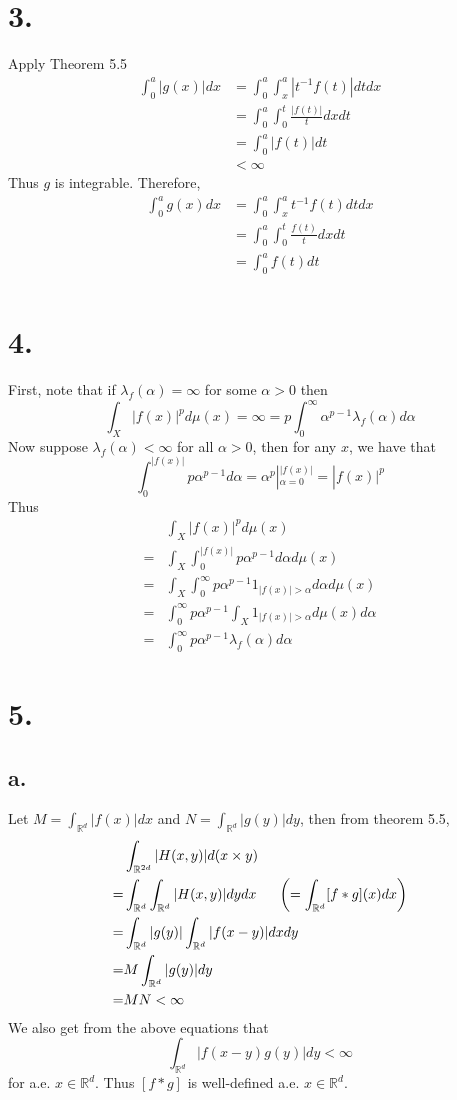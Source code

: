 \documentclass[11pt]{article}
\theoremstyle{mystyle}
\theoremstyle{definition}
\begin{document}
\section*{3.}
Apply Theorem 5.5
\begin{align*}
  \int_0^a |g(x)| dx 
  &= \int_0^a \int_x^a |t^{-1}f(t)| dt dx \\ 
  &= \int_0^a \int_0^t \displaystyle\frac{|f(t)|}{t} dx dt \\
  &= \int_0^a |f(t)| dt \\
  &< \infty
\end{align*}
Thus $g$ is integrable. Therefore, 
\begin{align*}
  \int_0^a g(x) dx 
  &= \int_0^a \int_x^a t^{-1}f(t) dt dx \\ 
  &= \int_0^a \int_0^t \displaystyle\frac{f(t)}{t} dx dt \\
  &= \int_0^a f(t) dt \\
\end{align*}
\newpage
\section*{4.}
First, note that if $\lambda_f(\alpha) = \infty$ for some $\alpha > 0$ then 
\[
  \int_X |f(x)|^p d\mu(x) = \infty = p \int_0^\infty \alpha^{p-1} \lambda_f(\alpha) d\alpha
\]
Now suppose $\lambda_f(\alpha) < \infty$ for all $\alpha > 0$, then for any $x$, we have that 
\[
  \int_0^{|f(x)|} p\alpha^{p-1} d\alpha = \alpha^p |_{\alpha = 0}^{|f(x)|} = |f(x)|^p
\]
Thus 
\begin{align*}
  &\int_X |f(x)|^p d\mu(x) \\
  =& \int_X \int_0^{|f(x)|} p \alpha^{p-1} d\alpha d\mu(x) \\
  =& \int_X \int_0^\infty p\alpha^{p-1} 1_{|f(x)| > \alpha} d\alpha d\mu(x) \\
  =& \int_0^\infty p\alpha^{p-1} \int_X 1_{|f(x)| > \alpha} d\mu(x)d\alpha \\
  =& \int_0^\infty p \alpha^{p-1} \lambda_f(\alpha) d\alpha
\end{align*}
\newpage
\section*{5.}
\subsection*{a.}
Let $M = \int_{\mathbb{R}^d} |f(x)| dx$ and $N = \int_{\mathbb{R}^d} |g(y)| dy$, then from theorem 5.5,  
\begin{align*}
  &\int_{\mathbb{R}^{2d}} |H(x,y)| d(x\times y) \\
  =& \int_{\mathbb{R}^d} \int_{\mathbb{R}^d} |H(x,y)| dy dx \indent  \left( =\int_{\mathbb{R}^d} [f * g](x) dx \right) \\
  =& \int_{\mathbb{R}^d} |g(y)| \int_{\mathbb{R}^d} |f(x-y)|  dx dy \\
  =& M \int_{\mathbb{R}^d} |g(y)| dy \\ 
  =& MN < \infty
\end{align*}
We also get from the above equations that 
\[
  \int_{\mathbb{R}^d} |f(x-y) g(y)| dy < \infty
\]
for a.e. $x \in \mathbb{R}^d$. Thus $[f*g]$ is well-defined a.e. $x \in \mathbb{R}^d$. 
\end{document}
